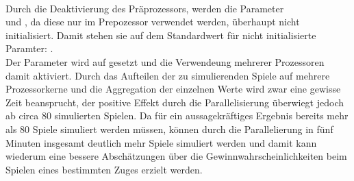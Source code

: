 \\Durch die Deaktivierung des Präprozessors, werden die Parameter \\ und , da diese nur im Prepozessor verwendet werden, überhaupt nicht initialisiert. Damit stehen sie auf dem Standardwert für nicht initialisierte Paramter: .
\\Der Parameter  wird auf  gesetzt und die Verwendeung mehrerer Prozessoren damit aktiviert. Durch das Aufteilen der zu simulierenden Spiele auf mehrere Prozessorkerne und die Aggregation der einzelnen Werte wird zwar eine gewisse Zeit beansprucht, der positive Effekt durch die Parallelisierung überwiegt jedoch ab circa 80 simulierten Spielen. Da für ein aussagekräftiges Ergebnis bereits mehr als 80 Spiele simuliert werden müssen, können durch die Parallelierung in fünf Minuten insgesamt deutlich mehr Spiele simuliert werden und damit kann wiederum eine bessere Abschätzungen über die Gewinnwahrscheinlichkeiten beim Spielen eines bestimmten Zuges erzielt werden.

